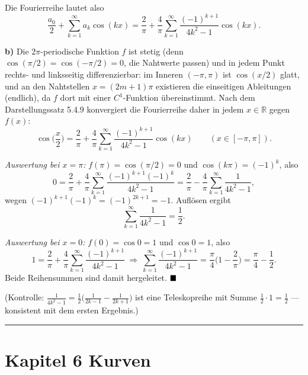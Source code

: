 \documentclass[a4paper,11pt]{article}
\providecommand{\qed}{\hfill\ensuremath{\blacksquare}}
\begin{document}
Die Fourierreihe lautet also
\[ \frac{a_0}{2}+\sum_{k=1}^\infty a_k\cos(kx)=\frac{2}{\pi}+\frac{4}{\pi}\sum_{k=1}^\infty \frac{(-1)^{k+1}}{4k^2-1}\cos(kx). \]

\textbf{b)} Die $2\pi$-periodische Funktion $f$ ist stetig (denn $\cos(\pi/2)=\cos(-\pi/2)=0$, die Nahtwerte passen) und in jedem Punkt rechts- und linksseitig differenzierbar: im Inneren $(-\pi,\pi)$ ist $\cos(x/2)$ glatt, und an den Nahtstellen $x=(2m+1)\pi$ existieren die einseitigen Ableitungen (endlich), da $f$ dort mit einer $C^1$-Funktion übereinstimmt. Nach dem Darstellungssatz 5.4.9 konvergiert die Fourierreihe daher in jedem $x\in\mathbb{R}$ gegen $f(x)$:
\[ \cos\!\Big(\frac{x}{2}\Big)=\frac{2}{\pi}+\frac{4}{\pi}\sum_{k=1}^\infty\frac{(-1)^{k+1}}{4k^2-1}\cos(kx)\qquad(x\in[-\pi,\pi]). \]

\emph{Auswertung bei $x=\pi$:} $f(\pi)=\cos(\pi/2)=0$ und $\cos(k\pi)=(-1)^k$, also
\[ 0=\frac{2}{\pi}+\frac{4}{\pi}\sum_{k=1}^\infty\frac{(-1)^{k+1}(-1)^k}{4k^2-1} = \frac{2}{\pi}-\frac{4}{\pi}\sum_{k=1}^\infty\frac{1}{4k^2-1}, \]
wegen $(-1)^{k+1}(-1)^k=(-1)^{2k+1}=-1$. Auflösen ergibt
\[ \sum_{k=1}^\infty\frac{1}{4k^2-1}=\frac{1}{2}. \]

\emph{Auswertung bei $x=0$:} $f(0)=\cos 0=1$ und $\cos 0=1$, also
\[ 1=\frac{2}{\pi}+\frac{4}{\pi}\sum_{k=1}^\infty\frac{(-1)^{k+1}}{4k^2-1} \ \Longrightarrow\ \sum_{k=1}^\infty\frac{(-1)^{k+1}}{4k^2-1}=\frac{\pi}{4}\Big(1-\frac{2}{\pi}\Big)=\frac{\pi}{4}-\frac{1}{2}. \]
Beide Reihensummen sind damit hergeleitet. $\qed$

(Kontrolle: $\frac{1}{4k^2-1}=\frac{1}{2}\big(\frac{1}{2k-1}-\frac{1}{2k+1}\big)$ ist eine Teleskopreihe mit Summe $\frac12\cdot 1=\frac12$ — konsistent mit dem ersten Ergebnis.)\par\bigskip\hrule\bigskip
\section*{Kapitel 6 \quad Kurven}
\end{document}
